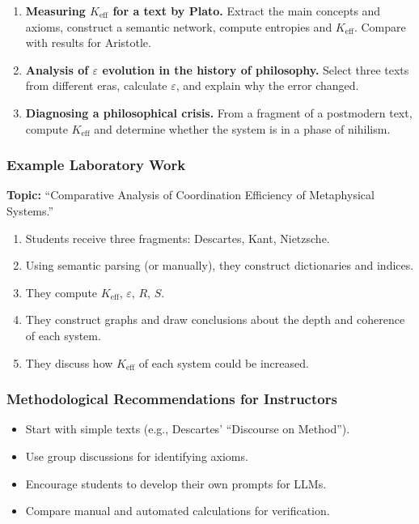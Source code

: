 \documentclass[12pt,a4paper]{article}
\newcommand{\eps}{\varepsilon}
\begin{document}
	\begin{enumerate}[label=(\arabic*)]
		\item \textbf{Measuring \(K_{\mathrm{eff}}\) for a text by Plato.} Extract the main concepts and axioms, construct a semantic network, compute entropies and \(K_{\mathrm{eff}}\). Compare with results for Aristotle.
		\item \textbf{Analysis of \(\eps\) evolution in the history of philosophy.} Select three texts from different eras, calculate \(\eps\), and explain why the error changed.
		\item \textbf{Diagnosing a philosophical crisis.} From a fragment of a postmodern text, compute \(K_{\mathrm{eff}}\) and determine whether the system is in a phase of nihilism.
	\end{enumerate}
	
	\subsubsection{Example Laboratory Work}
	
	\textbf{Topic:} ``Comparative Analysis of Coordination Efficiency of Metaphysical Systems.''
	
	\begin{enumerate}
		\item Students receive three fragments: Descartes, Kant, Nietzsche.
		\item Using semantic parsing (or manually), they construct dictionaries and indices.
		\item They compute \(K_{\mathrm{eff}}\), \(\eps\), \(R\), \(S\).
		\item They construct graphs and draw conclusions about the depth and coherence of each system.
		\item They discuss how \(K_{\mathrm{eff}}\) of each system could be increased.
	\end{enumerate}
	
	\subsubsection{Methodological Recommendations for Instructors}
	
	\begin{itemize}
		\item Start with simple texts (e.g., Descartes' ``Discourse on Method'').
		\item Use group discussions for identifying axioms.
		\item Encourage students to develop their own prompts for LLMs.
		\item Compare manual and automated calculations for verification.
	\end{itemize}
	
\end{document}

